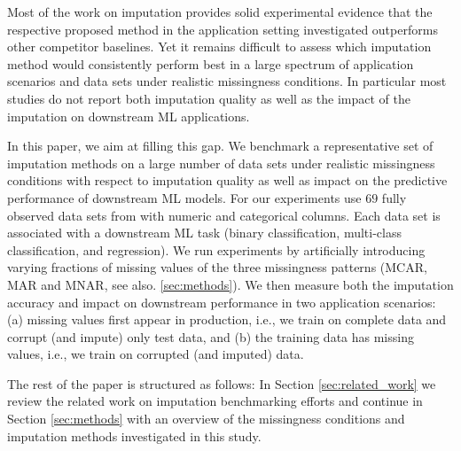 Most of the work on imputation provides solid experimental evidence that the respective proposed method in the application setting investigated outperforms other competitor baselines. Yet it remains difficult to assess which imputation method would consistently perform best in a large spectrum of application scenarios and data sets under realistic missingness conditions. In particular most studies do not report both imputation quality as well as the impact of the imputation on downstream ML applications.

In this paper, we aim at filling this gap. We benchmark a representative set of imputation methods on a large number of data sets under realistic missingness conditions with respect to imputation quality as well as impact on the predictive performance of downstream ML models. For our experiments use $69$ fully observed data sets from  \citep{OpenML2013} with numeric and categorical columns. Each data set is associated with a downstream ML task (binary classification, multi-class classification, and regression). We run experiments by artificially introducing varying fractions of missing values of the three missingness patterns (MCAR, MAR and MNAR, see also. \autoref{sec:methods}). We then measure both the imputation accuracy and impact on downstream performance in two application scenarios: (a) missing values first appear in production, i.e., we train on complete data and corrupt (and impute) only test data, and (b) the training data has missing values, i.e., we train on corrupted (and imputed) data. 

The rest of the paper is structured as follows: In Section \ref{sec:related_work} we review the related work on imputation benchmarking efforts and continue in Section \ref{sec:methods} with an overview of the missingness conditions and imputation methods investigated in this study.
